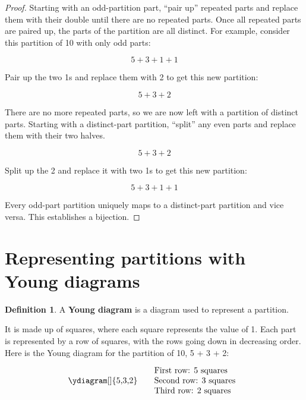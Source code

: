\documentclass{article}
\theoremstyle{definition}
\newtheorem{definition}{Definition}
\begin{document}
\begin{proof}
Starting with an odd-partition part, ``pair up'' repeated parts and replace them with their double until there are
no repeated parts. Once all repeated parts are paired up, the parts of the partition are all distinct.
\newline For example, consider this partition of 10 with only odd parts:

\[
5 + 3 + 1 + 1
\]

\noindent
Pair up the two 1s and replace them with 2 to get this new partition:

\[
5 + 3 + 2
\]

\noindent
There are no more repeated parts, so we are now left with a partition of distinct parts.
\newline Starting with a distinct-part partition, ``split'' any even parts and replace them with their two halves.

\[
5 + 3 + 2
\]

\noindent
Split up the 2 and replace it with two 1s to get this new partition:

\[
5 + 3 + 1 + 1
\]

\noindent
Every odd-part partition uniquely maps to a distinct-part partition and vice versa. This establishes a bijection.
\end{proof}

\section{Representing partitions with Young diagrams}

\begin{definition}
    A \textbf{Young diagram} is a diagram used to represent a partition.
\end{definition}

\noindent
It is made up of squares, where each square represents
the value of 1. Each part is represented by a row of squares, with the rows going down in decreasing order.
\newline Here is the Young diagram for the partition of 10, 5 + 3 + 2:

\[
\begin{minipage}{0.3\textwidth}
    \ydiagram[]
        {5,3,2}
\end{minipage}
\begin{minipage}{0.3\textwidth}
    First row: 5 squares \\
    Second row: 3 squares \\
    Third row: 2 squares
\end{minipage}
\]
\end{document}
